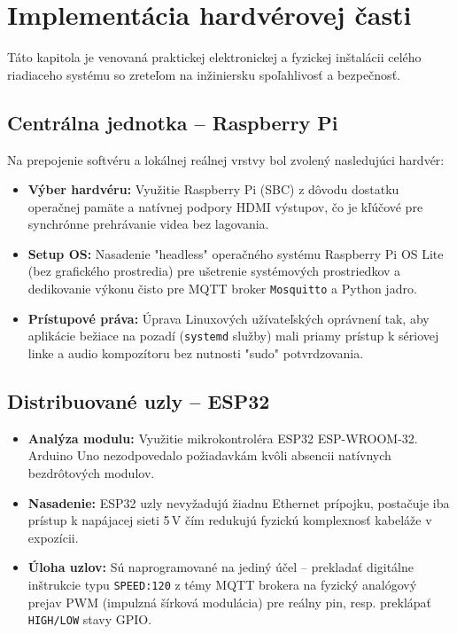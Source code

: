 \chapter{Implementácia hardvérovej časti}
\label{ImplementaciaHW}

Táto kapitola je venovaná praktickej elektronickej a fyzickej inštalácii celého riadiaceho systému so zreteľom na inžiniersku spoľahlivosť a bezpečnosť.

\section{Centrálna jednotka -- Raspberry Pi}
\label{CentralnaJednotka}

Na prepojenie softvéru a lokálnej reálnej vrstvy bol zvolený nasledujúci hardvér:
\begin{itemize}
    \item \textbf{Výber hardvéru:} Využitie Raspberry Pi (SBC) z dôvodu dostatku operačnej pamäte a natívnej podpory HDMI výstupov, čo je kľúčové pre synchrónne prehrávanie videa bez lagovania.
    \item \textbf{Setup OS:} Nasadenie "headless" operačného systému Raspberry Pi OS Lite (bez grafického prostredia) pre ušetrenie systémových prostriedkov a dedikovanie výkonu čisto pre MQTT broker \texttt{Mosquitto} a Python jadro.
    \item \textbf{Prístupové práva:} Úprava Linuxových užívateľských oprávnení tak, aby aplikácie bežiace na pozadí (\texttt{systemd} služby) mali priamy prístup k sériovej linke a audio kompozítoru bez nutnosti "sudo" potvrdzovania.
\end{itemize}

\section{Distribuované uzly -- ESP32}
\label{DistribuovaneUzly}

\begin{itemize}
    \item \textbf{Analýza modulu:} Využitie mikrokontroléra ESP32 ESP-WROOM-32. Arduino Uno nezodpovedalo požiadavkám kvôli absencii natívnych bezdrôtových modulov.
    \item \textbf{Nasadenie:} ESP32 uzly nevyžadujú žiadnu Ethernet prípojku, postačuje iba prístup k napájacej sieti 5\,V čím redukujú fyzickú komplexnosť kabeláže v expozícii.
    \item \textbf{Úloha uzlov:} Sú naprogramované na jediný účel -- prekladať digitálne inštrukcie typu \texttt{SPEED:120} z témy MQTT brokera na fyzický analógový prejav PWM (impulzná šírková modulácia) pre reálny pin, resp. preklápať \texttt{HIGH/LOW} stavy GPIO.
\end{itemize}

